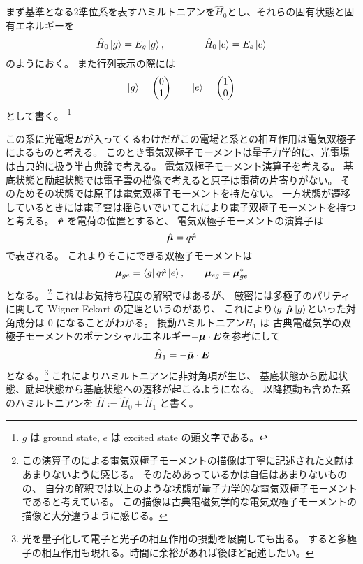 \documentclass[11pt,dvipdfmx,a4paper]{jsarticle}
\begin{document}
まず基準となる2準位系を表すハミルトニアンを\(\hat{H}_0\)とし、それらの固有状態と固有エネルギーを
\begin{equation}
	\hat{H}_0 \ket{g} = E_g \ket{g}, \qquad \qquad \hat{H}_0 \ket{e} = E_e \ket{e}
\end{equation}
のようにおく。
また行列表示の際には
\begin{equation}
	\ket{g} =
	\begin{pmatrix}
		0\\
		1
	\end{pmatrix}
	\qquad
	\ket{e} =
	\begin{pmatrix}
		1 \\
		0
	\end{pmatrix}
\end{equation}
として書く。
\footnote{\(g\) は ground state, \(e\) は excited state の頭文字である。}

この系に光電場\(\vb*{E}\)が入ってくるわけだがこの電場と系との相互作用は電気双極子によるものと考える。
このとき電気双極子モーメントは量子力学的に、光電場は古典的に扱う半古典論で考える。
電気双極子モーメント演算子を考える。
基底状態と励起状態では電子雲の描像で考えると原子は電荷の片寄りがない。
そのためその状態では原子は電気双極子モーメントを持たない。
一方状態が遷移しているときには電子雲は揺らいでいてこれにより電子双極子モーメントを持つと考える。
\(\hat{\vb*{r}}\) を電荷の位置とすると、
電気双極子モーメントの演算子は
\begin{equation}
	\hat{\vb*{\mu}} = q \hat{\vb*{r}}
\end{equation}
で表される。
これよりそこにできる双極子モーメントは
\begin{equation}
	\vb*{\mu}_{ge} = \bra{g}q\hat{\vb*{r}}\ket{e},\qquad \vb*{\mu}_{eg} = \vb*{\mu}_{ge}^{*}
\end{equation}
となる。
\footnote{この演算子のによる電気双極子モーメントの描像は丁寧に記述された文献はあまりないように感じる。
そのためあっているかは自信はあまりないものの、
自分の解釈では以上のような状態が量子力学的な電気双極子モーメントであると考えている。
この描像は古典電磁気学的な電気双極子モーメントの描像と大分違うように感じる。}
これはお気持ち程度の解釈ではあるが、
厳密には多極子のパリティに関して Wigner-Eckart の定理というのがあり、
これにより\(\bra{g}\hat{\vb*{\mu}}\ket{g}\)といった対角成分は \(0\) になることがわかる。
摂動ハミルトニアン\(H_1\) は
古典電磁気学の双極子モーメントのポテンシャルエネルギー\(-\vb*{\mu}\cdot\vb*{E}\)を参考にして
\begin{equation}
	\hat{H}_1 = - \hat{\vb*{\mu}}\cdot\vb*{E}
\end{equation}
となる。\footnote{光を量子化して電子と光子の相互作用の摂動を展開しても出る。
すると多極子の相互作用も現れる。時間に余裕があれば後ほど記述したい。}
これによりハミルトニアンに非対角項が生じ、
基底状態から励起状態、励起状態から基底状態への遷移が起こるようになる。
以降摂動も含めた系のハミルトニアンを \(\hat{H} := \hat{H}_0 + \hat{H}_1\) と書く。
\end{document}
